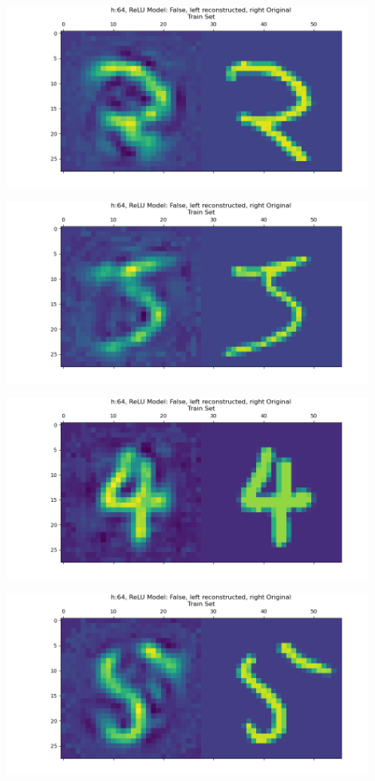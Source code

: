 \documentclass[]{article}
\begin{document}
        \begin{center}
            \includegraphics*[width=12cm]{A4plots/06-43-18-h-64-lin-digit-2.png}
        \end{center}
        \begin{center}
            \includegraphics*[width=12cm]{A4plots/06-43-18-h-64-lin-digit-3.png}
        \end{center}
        \begin{center}
            \includegraphics*[width=12cm]{A4plots/06-43-18-h-64-lin-digit-4.png}
        \end{center}
        \begin{center}
            \includegraphics*[width=12cm]{A4plots/06-43-18-h-64-lin-digit-5.png}
        \end{center}
\end{document}
